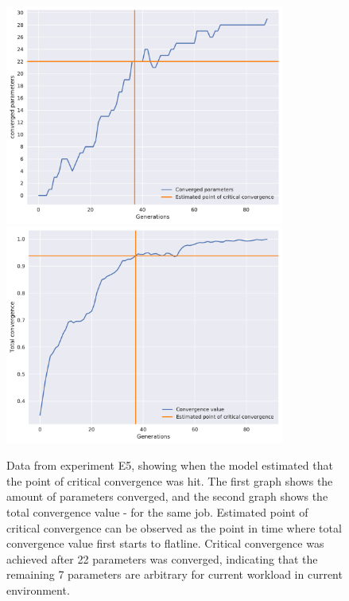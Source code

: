 \documentclass[a4paper,english]{report}
\begin{document}
		\begin{figure}[H]
			\centering
			\includegraphics[width=260pt]{est11}
			\includegraphics[width=260pt]{est12}
			\caption{Data from experiment E5, showing when the model estimated that the point of critical convergence was hit. The first graph shows the amount of parameters converged, and the second graph shows the total convergence value - for the same job. Estimated point of critical convergence can be observed as the point in time where total convergence value first starts to flatline. Critical convergence was achieved after 22 parameters was converged, indicating that the remaining 7 parameters are arbitrary for current workload in current environment.}
			\label{fig:estimation1}
		\end{figure}
\end{document}
